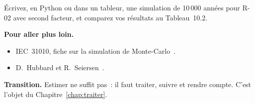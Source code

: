 \begin{boxexo}[title={\ding{45}\quad Exercice~10.10. Programmer \niveauexpert}]
Écrivez, en Python ou dans un tableur, une simulation de 10\,000 années
pour R-02 avec second facteur, et comparez vos résultats au
Tableau~10.2.
\end{boxexo}

\bigskip

\begin{boxinfo}
\textbf{Pour aller plus loin.}
\begin{itemize}
    \item IEC~31010, fiche sur la simulation de Monte-Carlo~\cite{iec31010}.
    \item D.~Hubbard et R.~Seiersen~\cite{hubbard2016cyber}.
\end{itemize}
\end{boxinfo}

\begin{boxinfo}
\textbf{Transition.} Estimer ne suffit pas~: il faut traiter, suivre et
rendre compte. C'est l'objet du Chapitre~\ref{chap:traiter}.
\end{boxinfo}
